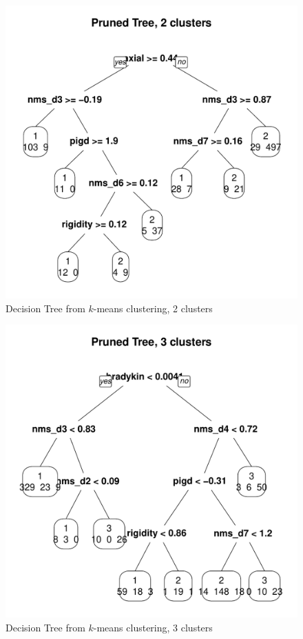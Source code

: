\documentclass[letterpaper,12pt]{article}
\begin{document}
\begin{figure}[ht]
  \centering
  \includegraphics[width=0.8\linewidth]{dtree-kmeans-pruned-2.pdf}
  \caption{Decision Tree from $k$-means clustering, 2 clusters}
  \label{fig:kmeans-dtree-2}
\end{figure}

\begin{figure}[ht]
  \centering
  \includegraphics[width=0.8\linewidth]{dtree-kmeans-pruned-3.pdf}
  \caption{Decision Tree from $k$-means clustering, 3 clusters}
  \label{fig:kmeans-dtree-3}
\end{figure}
\end{document}
